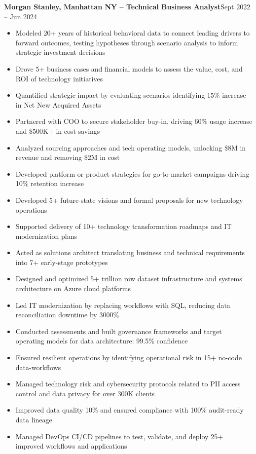 \documentclass[8pt]{extarticle}
\begin{document}
\vspace{0.25\baselineskip}
\textbf{Morgan Stanley, Manhattan NY -- Technical Business Analyst}\hfill Sept 2022 -- Jun 2024
\begin{itemize}
  \item Modeled 20+ years of historical behavioral data to connect leading drivers to forward outcomes, testing hypotheses through scenario analysis to inform strategic investment decisions
  \item Drove 5+ business cases and financial models to assess the value, cost, and ROI of technology initiatives
  \item Quantified strategic impact by evaluating scenarios identifying 15\% increase in Net New Acquired Assets
  \item Partnered with COO to secure stakeholder buy-in, driving 60\% usage increase and \$500K+ in cost savings
  \item Analyzed sourcing approaches and tech operating models, unlocking \$8M in revenue and removing \$2M in cost
  \item Developed platform or product strategies for go-to-market campaigns driving 10\% retention increase
  \item Developed 5+ future-state visions and formal proposals for new technology operations
  \item Supported delivery of 10+ technology transformation roadmaps and IT modernization plans
  \item Acted as solutions architect translating business and technical requirements into 7+ early-stage prototypes
  \item Designed and optimized 5+ trillion row dataset infrastructure and systems architecture on Azure cloud platforms
  \item Led IT modernization by replacing workflows with SQL, reducing data reconciliation downtime by 3000\%
  \item Conducted assessments and built governance frameworks and target operating models for data architecture: 99.5\% confidence
  \item Ensured resilient operations by identifying operational risk in 15+ no-code data-workflows
  \item Managed technology risk and cybersecurity protocols related to PII access control and data privacy for over 300K clients
  \item Improved data quality 10\% and ensured compliance with 100\% audit-ready data lineage
  \item Managed DevOps CI/CD pipelines to test, validate, and deploy 25+ improved workflows and applications

\end{itemize}
\end{document}
